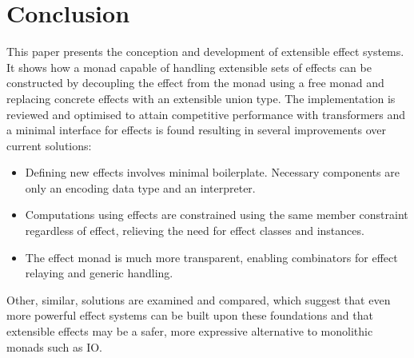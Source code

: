 \section{Conclusion}

This paper presents the conception and development of extensible effect systems.
It shows how a monad capable of handling extensible sets of effects can be
constructed by decoupling the effect from the monad using a free monad and
replacing concrete effects with an extensible union type. The implementation is
reviewed and optimised to attain competitive performance with transformers and a
minimal interface for effects is found resulting in several improvements over
current solutions:

\begin{itemize}
  \item Defining new effects involves minimal boilerplate. Necessary components
    are only an encoding data type and an interpreter.
  \item Computations using effects are constrained using the same member
    constraint regardless of effect, relieving the need for effect classes and
    instances.
  \item The effect monad is much more transparent, enabling combinators for
    effect relaying and generic handling.
\end{itemize}

Other, similar, solutions are examined and compared, which suggest that even
more powerful effect systems can be built upon these foundations and that
extensible effects may be a safer, more expressive alternative to monolithic
monads such as IO.
